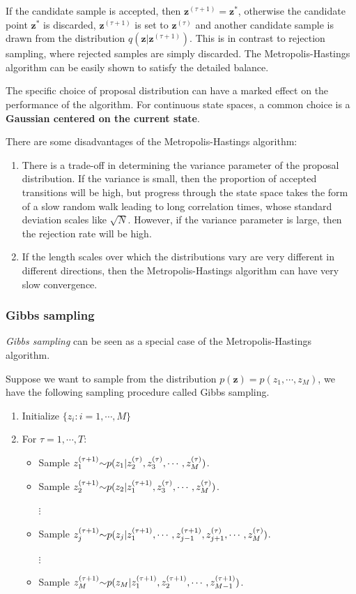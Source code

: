 \documentclass[a4paper]{book}
\newcommand{\wave}{\scriptsize{\sim}}
\renewcommand{\bf}{\mathbf}
\newcommand{\imp}[1]{\textit{#1}}
\begin{document}
If the candidate sample is accepted, then $\bf{z}^{(\tau + 1)} = \bf{z}^*$, otherwise the candidate point $\bf{z}^*$ is discarded, $\bf{z}^{(\tau+1)}$ is set to $\bf{z}^{(\tau)}$ and another candidate sample is drawn from the distribution $q(\bf{z}|\bf{z}^{(\tau+1)})$. This is in contrast to rejection sampling, where rejected samples are simply discarded. The Metropolis-Hastings algorithm can be easily shown to satisfy the detailed balance.

The specific choice of proposal distribution can have a marked effect on the performance of the algorithm. For continuous state spaces, a common choice is a \textbf{Gaussian centered on the current state}.

There are some disadvantages of the Metropolis-Hastings algorithm:
\begin{enumerate}
	\item There is a trade-off in determining the variance parameter of the proposal distribution. If the variance is small, then the proportion of accepted transitions will be high, but progress through the state space takes the form of a slow random walk leading to long correlation times, whose standard deviation scales like $\sqrt{N}$. However, if the variance parameter is large, then the rejection rate will be high.
	\item If the length scales over which the distributions vary are very different in different directions, then the Metropolis-Hastings algorithm can have very slow convergence.
\end{enumerate}
\subsubsection{Gibbs sampling}
\imp{Gibbs sampling} can be seen as a special case of the Metropolis-Hastings algorithm. 

Suppose we want to sample from the distribution $p(\bf{z}) = p(z_1,\cdots,z_M)$, we have the following sampling procedure called Gibbs sampling.
\begin{enumerate}
	\item Initialize $\{ z_i:i=1,\cdots,M \}$
	\item For $\tau = 1,\cdots,T$:
	\begin{itemize}
		\item Sample $z_1^{(\tau+1)} \wave p(z_1|z_2^{(\tau)},z_3^{(\tau)},\cdots,z_M^{(\tau)})$.
		\item Sample $z_2^{(\tau+1)} \wave p(z_2|z_1^{(\tau+1)},z_3^{(\tau)},\cdots,z_M^{(\tau)})$.
		
		$\vdots$
		\item Sample $z_j^{(\tau+1)}\wave p(z_j|z_1^{(\tau+1)},\cdots,z_{j-1}^{(\tau+1)},z_{j+1}^{(\tau)},\cdots,z_M^{(\tau)})$.
		
		$\vdots$
		\item Sample $z_M^{(\tau+1)}\wave p(z_M|z_1^{(\tau+1)},z_2^{(\tau+1)},\cdots,z_{M-1}^{(\tau+1)})$.
	\end{itemize}
\end{enumerate}
\end{document}
